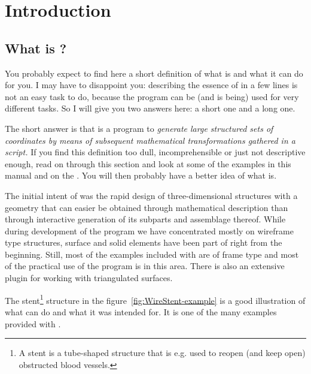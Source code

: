 
\chapter{Introduction}
\label{cha:introduction}

\section{What is \pyformex?}
\label{sec:what-pyformex}
You probably expect to find here a short definition of what \pyformex is and what it can do for you. I may have to disappoint you: describing the essence of \pyformex in a few lines is not an easy task to do, because the program can be (and is being) used for very different tasks. So I will give you two answers here: a short one and a long one.

The short answer is that \pyformex is a program to \emph{generate large structured sets of coordinates by means of subsequent mathematical transformations gathered in a script.}
If you find this definition too dull, incomprehensible or just not descriptive enough, read on through this section and look at some of the examples in this manual and on the . You will then probably have a better idea of what \pyformex{} is. 

The initial intent of \pyformex was the rapid design of three-dimensional structures with a geometry that can easier be obtained through mathematical description than through interactive generation of its subparts and assemblage thereof. While during development of the program we have concentrated mostly on wireframe type structures, surface and solid elements have been part of \pyformex right from the beginning. Still, most of the examples included with \pyformex are of frame type and most of the practical use of the program is in this area. There is also an extensive plugin for working with triangulated surfaces.

The stent\footnote{A stent is a tube-shaped structure that is e.g. used to reopen (and keep open) obstructed blood vessels.} structure in the figure~\ref{fig:WireStent-example} is a good illustration of what \pyformex can do and what it was intended for. It is one of the many examples provided with \pyf.

